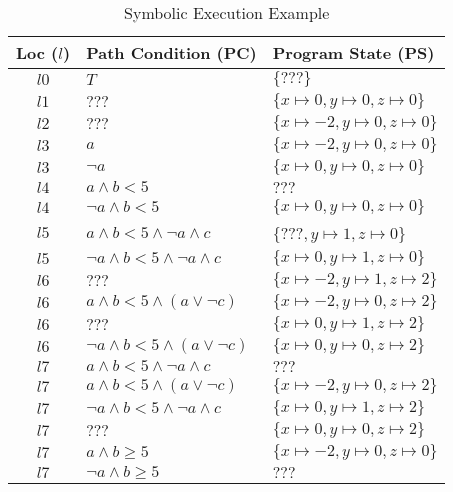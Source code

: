 \documentclass[10pt]{article}
\begin{document}
\begin{table}
    \centering
    \caption{Symbolic Execution Example}\label{tab:symbolic-execution}
    \begin{tabular}{c|l|l}
\toprule
\textbf{Loc ($l$)} & \textbf{Path Condition} (PC) & \textbf{Program State} (PS) \\
\midrule
$l0$ & $T$ & $\{???\}$ \\
$l1$ & $???$ & $\{x\mapsto0, y\mapsto0, z\mapsto0\}$ \\
$l2$ & $???$ & $\{x\mapsto-2, y\mapsto0, z\mapsto0\}$ \\
\midrule
$l3$ & $a$ & $\{x\mapsto-2, y\mapsto0, z\mapsto0\}$ \\
$l3$ & $\lnot a$ & $\{x\mapsto0, y\mapsto0, z\mapsto0\}$ \\
\midrule
$l4$ & $a \land b < 5$ & $???$ \\
$l4$ & $\lnot a \land b < 5$ & $\{x\mapsto0, y\mapsto0, z\mapsto0\}$ \\
\midrule
$l5$ & $a \land b < 5 \land \lnot a \land c$ & $\{$???$, y\mapsto1, z\mapsto0\}$ \\
$l5$ & $\lnot a \land b < 5 \land \lnot a \land c$ & $\{x\mapsto0, y\mapsto1, z\mapsto0\}$ \\
\midrule
$l6$ & $???$ & $\{x\mapsto-2, y\mapsto1, z\mapsto2\}$ \\
$l6$ & $a \land b < 5 \land (a \lor \lnot c)$ & $\{x\mapsto-2, y\mapsto0, z\mapsto2\}$ \\
$l6$ & $???$ & $\{x\mapsto0, y\mapsto1, z\mapsto2\}$ \\
$l6$ & $\lnot a \land b < 5 \land (a \lor \lnot c)$ & $\{x\mapsto0, y\mapsto0, z\mapsto2\}$ \\
\midrule
$l7$ & $a \land b < 5 \land \lnot a \land c$ & $???$ \\
$l7$ & $a \land b < 5 \land (a \lor \lnot c)$ & $\{x\mapsto-2, y\mapsto0, z\mapsto2\}$ \\
$l7$ & $\lnot a \land b < 5 \land \lnot a \land c$ & $\{x\mapsto0, y\mapsto1, z\mapsto2\}$ \\
$l7$ & $???$ & $\{x\mapsto0, y\mapsto0, z\mapsto2\}$ \\

$l7$ & $a \land b \ge 5$ & $\{x\mapsto-2, y\mapsto0, z\mapsto0\}$ \\
$l7$ & $\lnot a \land b \ge 5 $ & $???$\\
\bottomrule
\end{tabular}
\end{table}

\newpage
\end{document}
